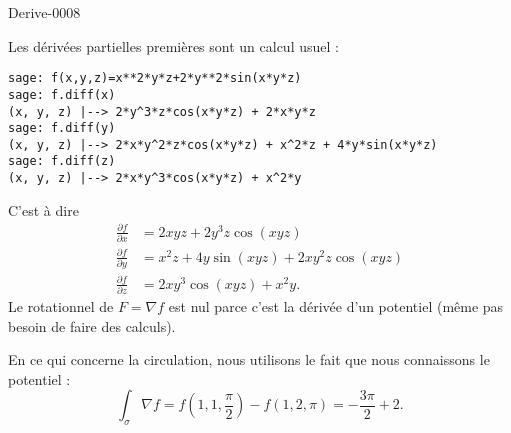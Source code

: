 
\begin{corrige}{Derive-0008}

    Les dérivées partielles premières sont un calcul usuel :
    \begin{verbatim}
sage: f(x,y,z)=x**2*y*z+2*y**2*sin(x*y*z)                                                                                                                   
sage: f.diff(x)
(x, y, z) |--> 2*y^3*z*cos(x*y*z) + 2*x*y*z
sage: f.diff(y)
(x, y, z) |--> 2*x*y^2*z*cos(x*y*z) + x^2*z + 4*y*sin(x*y*z)
sage: f.diff(z)
(x, y, z) |--> 2*x*y^3*cos(x*y*z) + x^2*y
    \end{verbatim}
    C'est à dire
    \begin{subequations}
        \begin{align}
            \frac{ \partial f }{ \partial x }&=2xyz+2y^3z\cos(xyz)\\
            \frac{ \partial f }{ \partial y }&=x^2z+4y\sin(xyz)+2xy^2z\cos(xyz)  \\
            \frac{ \partial f }{ \partial z }&=2xy^3\cos(xyz)+x^2y.
        \end{align}
    \end{subequations}
    Le rotationnel de \( F=\nabla f\) est nul parce c'est la dérivée d'un potentiel (même pas besoin de faire des calculs).

    En ce qui concerne la circulation, nous utilisons le fait que nous connaissons le potentiel :
    \begin{equation}
        \int_{\sigma}\nabla f=f(1,1,\frac{ \pi }{2})-f(1,2,\pi)=-\frac{ 3\pi }{2}+2.
    \end{equation}

\end{corrige}
